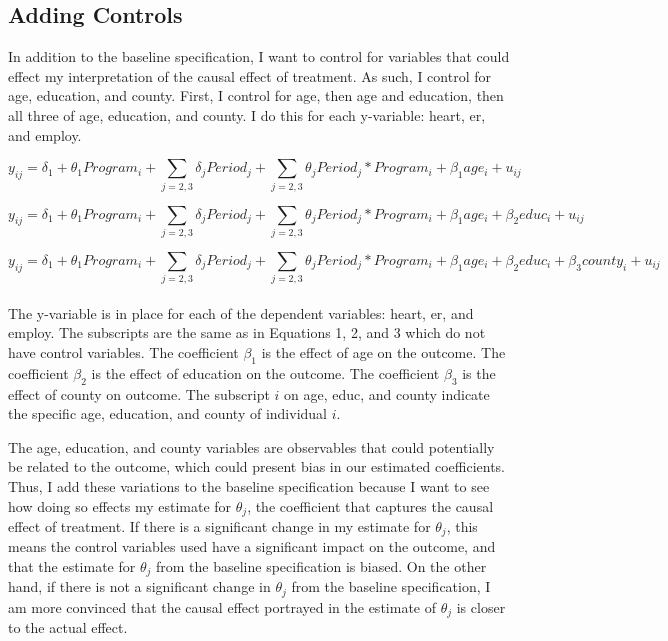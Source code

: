 \documentclass[a4paper]{article}
\begin{document}
\subsection{Adding Controls}

In addition to the baseline specification, I want to control for variables that could effect my interpretation of the causal effect of treatment. As such, I control for age, education, and county. First, I control for age, then age and education, then all three of age, education, and county. I do this for each y-variable: heart, er, and employ. 

\begin{equation}
y_{ij} = \delta_1 + \theta_1 Program_i + \sum_{j=2,3} \delta_j Period_j + \sum_{j=2,3} \theta_j Period_j * Program_i + \beta_{1} age_i + u_{ij}
\end{equation}

\begin{equation}
y_{ij} = \delta_1 + \theta_1 Program_i + \sum_{j=2,3} \delta_j Period_j + \sum_{j=2,3} \theta_j Period_j * Program_i + \beta_{1} age_i + \beta_{2} educ_i + u_{ij}
\end{equation}

\begin{equation}
y_{ij} = \delta_1 + \theta_1 Program_i + \sum_{j=2,3} \delta_j Period_j + \sum_{j=2,3} \theta_j Period_j * Program_i + \beta_{1} age_i + \beta_{2} educ_i + \beta_{3} county_i + u_{ij}
\end{equation}
\\
The y-variable is in place for each of the dependent variables: heart, er, and employ. The subscripts are the same as in Equations 1, 2, and 3 which do not have control variables. The coefficient $\beta_{1}$ is the effect of age on the outcome. The coefficient $\beta_{2}$ is the effect of education on the outcome. The coefficient $\beta_{3}$ is the effect of county on outcome. The subscript $i$ on age, educ, and county indicate the specific age, education, and county of individual $i$.

The age, education, and county variables are observables that could potentially be related to the outcome, which could present bias in our estimated coefficients. Thus, I add these variations to the baseline specification because I want to see how doing so effects my estimate for $\theta_j$, the coefficient that captures the causal effect of treatment. If there is a significant change in my estimate for $\theta_j$, this means the control variables used have a significant impact on the outcome, and that the estimate for $\theta_j$ from the baseline specification is biased. On the other hand, if there is not a significant change in $\theta_j$ from the baseline specification, I am more convinced that the causal effect portrayed in the estimate of $\theta_j$ is closer to the actual effect.
\end{document}
